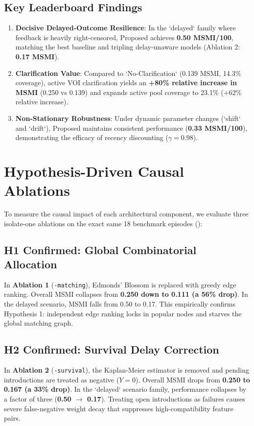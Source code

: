\documentclass[10pt,twocolumn,letterpaper]{article}
\begin{document}
\subsection{Key Leaderboard Findings}
\begin{enumerate}[leftmargin=*]
    \item \textbf{Decisive Delayed-Outcome Resilience}: In the `delayed` family where feedback is heavily right-censored, Proposed achieves \textbf{0.50 MSMI/100}, matching the best baseline and tripling delay-unaware models (Ablation 2: \textbf{0.17 MSMI}).
    \item \textbf{Clarification Value}: Compared to `No-Clarification` (0.139 MSMI, 14.3\% coverage), active VOI clarification yields an \textbf{+80\% relative increase in MSMI} (0.250 vs 0.139) and expands active pool coverage to 23.1\% (+62\% relative increase).
    \item \textbf{Non-Stationary Robustness}: Under dynamic parameter changes (`shift` and `drift`), Proposed maintains consistent performance (\textbf{0.33 MSMI/100}), demonstrating the efficacy of recency discounting ($\gamma = 0.98$).
\end{enumerate}

\section{Hypothesis-Driven Causal Ablations}
\label{sec:ablations}

To measure the causal impact of each architectural component, we evaluate three isolate-one ablations on the exact same 18 benchmark episodes ():

\subsection{H1 Confirmed: Global Combinatorial Allocation}
In \textbf{Ablation 1} (\texttt{-matching}), Edmonds' Blossom is replaced with greedy edge ranking. Overall MSMI collapses from \textbf{0.250 down to 0.111 (a 56\% drop)}. In the delayed scenario, MSMI falls from 0.50 to 0.17. This empirically confirms Hypothesis 1: independent edge ranking locks in popular nodes and starves the global matching graph.

\subsection{H2 Confirmed: Survival Delay Correction}
In \textbf{Ablation 2} (\texttt{-survival}), the Kaplan-Meier estimator is removed and pending introductions are treated as negative ($Y = 0$). Overall MSMI drops from \textbf{0.250 to 0.167 (a 33\% drop)}. In the `delayed` scenario family, performance collapses by a factor of three (\textbf{0.50 $\rightarrow$ 0.17}). Treating open introductions as failures causes severe false-negative weight decay that suppresses high-compatibility feature pairs.
\end{document}
